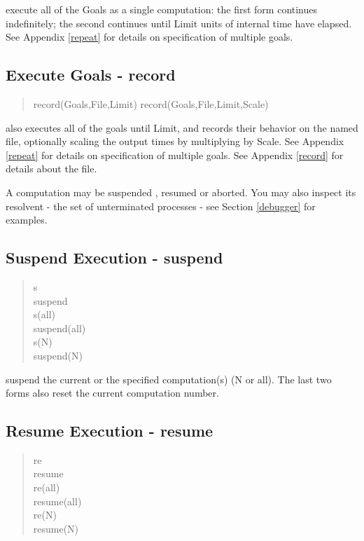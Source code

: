 \noindent
execute all of the Goals as a single computation: the first form continues
indefinitely; the second continues until Limit units of internal time have 
elapsed.  See  Appendix \ref{repeat} for details on specification 
of multiple goals.

\subsection{Execute Goals - record}
\label{recorders}
\begin{verse}
    record(Goals,File,Limit)
    record(Goals,File,Limit,Scale)
\end{verse}

\noindent
also executes all of the goals until Limit, and records their behavior
on the named file, optionally scaling the output times by multiplying
by Scale.  See  Appendix \ref{repeat} for
details on specification of multiple goals.  See  Appendix 
\ref{record} for details about the file.

\noindent
A computation may be  suspended ,  resumed  or  aborted.  You may also
inspect its resolvent - the set of unterminated processes  - see
Section \ref{debugger} for examples.

\subsection{Suspend Execution - suspend}

\begin{verse}
    s \\
    suspend \\
    s(all) \\
    suspend(all) \\
    s(N) \\
    suspend(N)
\end{verse}

\noindent
suspend the current or the specified computation(s) (N or all).  The last
two forms also reset the current computation number.

\subsection{Resume Execution - resume}

\begin{verse}
    re \\
    resume \\
    re(all) \\
    resume(all) \\
    re(N) \\
    resume(N)
\end{verse}

